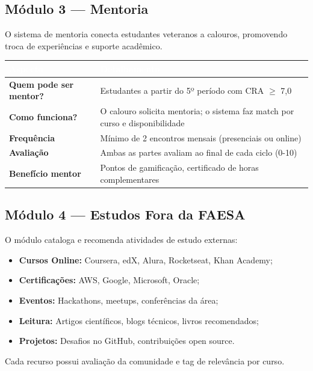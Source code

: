 \documentclass[12pt, a4paper]{article}
\begin{document}
\subsection{Módulo 3 --- Mentoria}

O sistema de mentoria conecta estudantes veteranos a calouros, promovendo troca de experiências e suporte acadêmico.

\begin{center}
\begin{tabularx}{\textwidth}{|l|X|}
\hline
\rowcolor{faesaAzul}
\textcolor{white}{\textbf{Aspecto}} & \textcolor{white}{\textbf{Detalhamento}} \\
\hline
\textbf{Quem pode ser mentor?} & Estudantes a partir do 5º período com CRA $\geq$ 7,0 \\
\hline
\textbf{Como funciona?} & O calouro solicita mentoria; o sistema faz match por curso e disponibilidade \\
\hline
\textbf{Frequência} & Mínimo de 2 encontros mensais (presenciais ou online) \\
\hline
\textbf{Avaliação} & Ambas as partes avaliam ao final de cada ciclo (0-10) \\
\hline
\textbf{Benefício mentor} & Pontos de gamificação, certificado de horas complementares \\
\hline
\end{tabularx}
\end{center}

\subsection{Módulo 4 --- Estudos Fora da FAESA}

\begin{destaque}
O módulo cataloga e recomenda atividades de estudo externas:
\begin{itemize}
    \item \textbf{Cursos Online:} Coursera, edX, Alura, Rocketseat, Khan Academy;
    \item \textbf{Certificações:} AWS, Google, Microsoft, Oracle;
    \item \textbf{Eventos:} Hackathons, meetups, conferências da área;
    \item \textbf{Leitura:} Artigos científicos, blogs técnicos, livros recomendados;
    \item \textbf{Projetos:} Desafios no GitHub, contribuições open source.
\end{itemize}
Cada recurso possui avaliação da comunidade e tag de relevância por curso.
\end{destaque}
\end{document}
